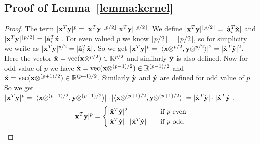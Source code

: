 \subsection{Proof of Lemma~\ref{lemma:kernel}}
\begin{proof}{\label{proof:kernel}}
The term $|\mathbf{x}^{T}\mathbf{y}|^{p}=|\mathbf{x}^{T}\mathbf{y}|^{\lfloor p/2 \rfloor}|\mathbf{x}^{T}\mathbf{y}|^{\lceil p/2 \rceil}$. We define $|\mathbf{x}^{T}\mathbf{y}|^{\lfloor p/2 \rfloor} = |\grave{\mathbf{a}}_{i}^{T}\grave{\mathbf{x}}|$ and $|\mathbf{x}^{T}\mathbf{y}|^{\lceil p/2 \rceil} = |\acute{\mathbf{a}}_{i}^{T}\acute{\mathbf{x}}|$. For even valued $p$ we know $\lfloor p/2 \rfloor=\lceil p/2 \rceil$, so for simplicity we write as $|\mathbf{x}^{T}\mathbf{y}|^{p/2} = |\hat{\mathbf{a}}_{i}^{T}\hat{\mathbf{x}}|$. So we get $|\mathbf{x}^{T}\mathbf{y}|^{p} = |\langle \mathbf{x} \otimes^{p/2}, \mathbf{y} \otimes^{p/2} \rangle|^{2} = |\hat{\mathbf{x}}^{T}\hat{\mathbf{y}}|^{2}$. Here the vector $\hat{\mathbf{x}} = \mbox{vec}(\mathbf{x} \otimes^{p/2}) \in \mathbb{R}^{p/2}$ and similarly $\hat{\mathbf{y}}$ is also defined. Now for odd value of $p$ we have $\grave{\mathbf{x}} = \mbox{vec}(\mathbf{x} \otimes^{(p-1)/2}) \in \mathbb{R}^{(p-1)/2}$ and $\acute{\mathbf{x}} = \mbox{vec}(\mathbf{x} \otimes^{(p+1)/2}) \in \mathbb{R}^{(p+1)/2}$. Similarly $\grave{\mathbf{y}}$ and $\acute{\mathbf{y}}$ are defined for odd value of $p$. So we get $|\mathbf{x}^{T}\mathbf{y}|^{p} = |\langle \mathbf{x} \otimes^{(p-1)/2}, \mathbf{y} \otimes^{(p-1)/2} \rangle|\cdot|\langle \mathbf{x} \otimes^{(p+1)/2}, \mathbf{y} \otimes^{(p+1)/2} \rangle| = |\grave{\mathbf{x}}^{T}\grave{\mathbf{y}}|\cdot|\acute{\mathbf{x}}^{T}\acute{\mathbf{y}}|$.
\[|\mathbf{x}^{T}\mathbf{y}|^{p} =
  \begin{cases}
  |\hat{\mathbf{x}}^{T}\hat{\mathbf{y}}|^{2}  & \quad \text{if } p \mbox{ even}\\
  |\grave{\mathbf{x}}^{T}\grave{\mathbf{y}}|\cdot|\acute{\mathbf{x}}^{T}\acute{\mathbf{y}}|  & \quad \text{if } p\ \mbox{odd}\\
  \end{cases}
\]
\end{proof}
% 

